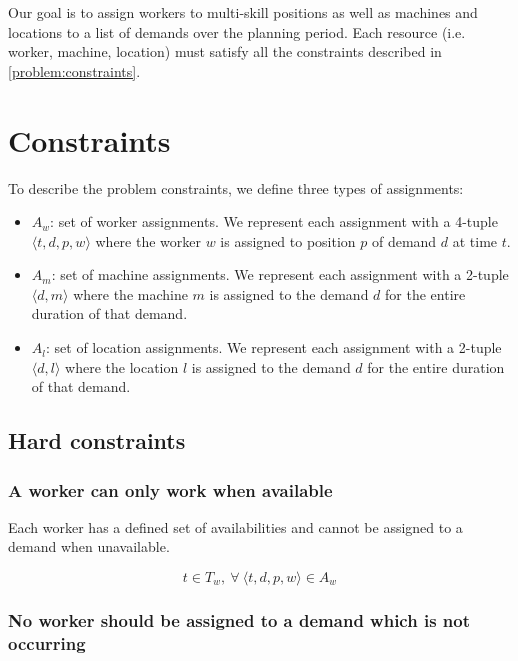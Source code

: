 \documentclass[../thesis.tex]{subfiles}
\begin{document}
Our goal is to assign workers to multi-skill positions as well as machines and locations to a list of demands over the planning period.
Each resource (i.e. worker, machine, location) must satisfy all the constraints described in \autoref{problem:constraints}.


\section{Constraints}
\label{problem:constraints}

To describe the problem constraints, we define three types of assignments:

\begin{itemize}
  \item $A_w$: set of worker assignments. We represent each assignment with a 4-tuple $\langle t, d, p, w\rangle$ where the worker $w$ is assigned to position $p$ of demand $d$ at time $t$.
  \item $A_m$: set of machine assignments. We represent each assignment with a 2-tuple $\langle d, m\rangle$ where the machine $m$ is assigned to the 
        demand $d$ for the entire duration of that demand.
  \item $A_l$: set of location assignments. We represent each assignment 
        with a 2-tuple $\langle d, l\rangle$ where the location $l$ is assigned to the demand $d$ for the entire duration 
        of that demand.
\end{itemize}

\subsection{Hard constraints}

\subsubsection{A worker can only work when available}

Each worker has a defined set of availabilities and cannot be assigned to a demand when 
unavailable.

\begin{equation*}
  t \in T_w, \ \forall \ \langle t, d, p, w\rangle \in A_w
\end{equation*}

\subsubsection{No worker should be assigned to a demand which is not occurring}
\end{document}
